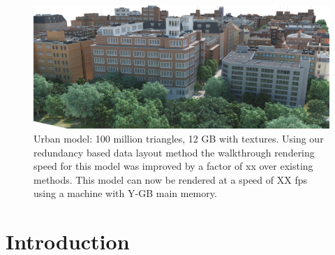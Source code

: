 \begin{figure}[t]
  \centering
  \includegraphics[width=\columnwidth]{densecity.jpg}
  \caption{Urban model: 100 million triangles, 12 GB with textures. Using our redundancy based data layout method the walkthrough rendering speed for this model was improved by a factor of xx over existing methods. This model can now be rendered at a speed of XX fps using a machine with Y-GB main memory.}
  \label{fig:model3}
\end{figure}

\section{Introduction}


